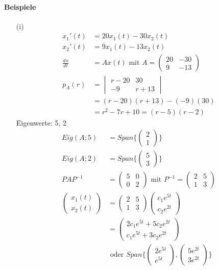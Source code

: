 \paragraph{Beispiele}
\begin{itemize}
\item[(i)]
\begin{align}
x_1' (t) &= 20 x_1 (t) - 30 x_2 (t) \\
x_2' (t) &= 9 x_1 (t) - 13 x_2 (t) \\
\frac{dx}{dt} &= Ax(t) \text{ mit } A = \begin{pmatrix} 20 & -30 \\ 9 & -13 \end{pmatrix} \\
p_A(r)& = \begin{vmatrix} r-20 & 30 \\ -9 & r+13\end{vmatrix} \\
&= (r-20)(r+13) - (-9)(30) \\
&= r^2 - 7r + 10 = (r-5)(r-2)
\end{align}
\f{Eigenwerte}: 5, 2 
\begin{align}
Eig(A; 5) &= Span\{\begin{pmatrix} 2 \\ 1\end{pmatrix}\} \\
Eig(A; 2) &= Span\{\begin{pmatrix} 5 \\ 3\end{pmatrix}\} \\
PAP^{-1} &= \begin{pmatrix} 5 & 0 \\ 0 & 2 \end{pmatrix} \text{ mit } P^{-1} = \begin{pmatrix} 2 & 5 \\ 1 & 3\end{pmatrix} \\
\begin{pmatrix} x_1 (t) \\ x_2(t) \end{pmatrix} &= \begin{pmatrix} 2 & 5 \\ 1 & 3\end{pmatrix} \begin{pmatrix} c_1 e^{5t} \\ c_2 e^{2t}\end{pmatrix} \\
&= \begin{pmatrix} 2c_1 e^{5t} + 5c_2 e^{2t} \\ c_1 e^{5t} + 3c_2 e^{2t}\end{pmatrix} \\
&\text{ oder } Span\{\begin{pmatrix} 2e^{5t} \\ e^{5t}\end{pmatrix}, \begin{pmatrix} 5e^{2t} \\ 3e^{2t}\end{pmatrix}\}
\end{align}


\end{itemize}
